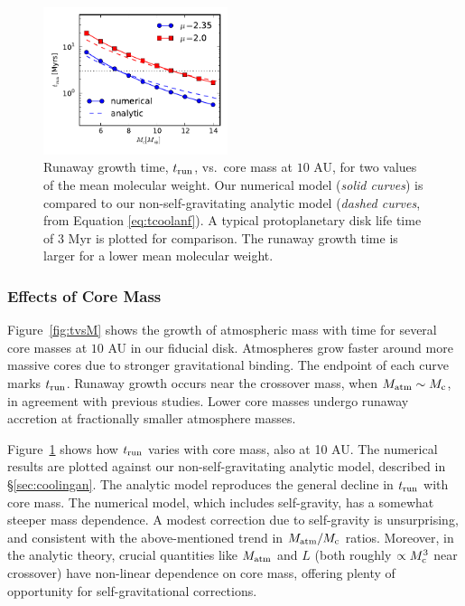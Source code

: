 \documentclass[apj, numberedappendix]{emulateapj}
\newcommand{\Fig}[1]{Figure~\ref{#1}}
\newcommand{\co}{_{\rm c}}
\begin{document}
\begin{figure}[htb]
\centering
\includegraphics[width=0.48\textwidth]{coolingtime_vs_Mc_10au.pdf}
\caption{Runaway growth time, $t_{\rm{run}}$, vs.\ core mass at $10$ AU, for two values of the mean molecular weight.  Our numerical model (\emph{solid curves}) is compared to our non-self-gravitating analytic model (\emph{dashed curves}, from Equation \ref{eq:tcoolanf}).  A typical protoplanetary disk life time of $3$ Myr is plotted for comparison. The runaway growth time is larger for a lower mean molecular weight.}
\label{fig:tvsMcomp}
\end{figure}


\subsubsection{Effects of Core Mass}
\label{Mct}

\Fig{fig:tvsM} shows the growth of atmospheric mass with time for several core masses at $10$ AU in our fiducial disk.  Atmospheres grow faster around more massive cores due to stronger gravitational binding.  The endpoint of each curve marks $t_{\rm run}$.   Runaway growth occurs near the crossover mass, when $M_{\rm atm} \sim M\co$, in agreement with previous studies. Lower core masses undergo runaway accretion at fractionally smaller atmosphere masses. %

\Fig{fig:tvsMcomp} shows how $t_{\rm run}$ varies with core mass, also at 10 AU.  The numerical results are plotted against our non-self-gravitating analytic model, described in \S\ref{sec:coolingan}.  The analytic model reproduces the general decline in $t_{\rm run}$ with core mass.  The numerical model, which includes self-gravity, has a somewhat steeper mass dependence.  A modest correction due to self-gravity is unsurprising, and consistent with the above-mentioned trend in $M_{\rm atm}/M\co$ ratios.  Moreover, in the analytic theory, crucial quantities like $M_{\rm atm}$ and $L$ (both roughly $\propto M\co^3$ near crossover) have non-linear dependence on core mass, offering plenty of opportunity for self-gravitational corrections.
\end{document}
